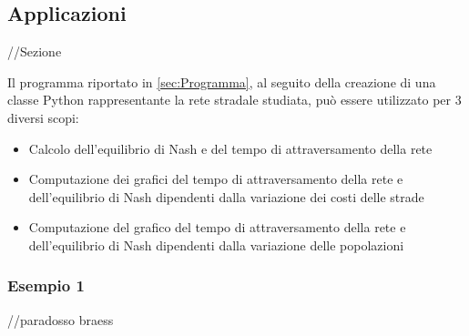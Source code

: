 \subsection{Applicazioni}//Sezione
\label{subsec:Esempi}

Il programma riportato in \autoref{sec:Programma}, al seguito della creazione di una classe Python \cite{python_docs} rappresentante
la rete stradale studiata, può essere utilizzato per 3 diversi scopi:
\begin{itemize}
    \item Calcolo dell'equilibrio di Nash e del tempo di attraversamento della rete
    \item Computazione dei grafici del tempo di attraversamento della rete e dell'equilibrio di Nash dipendenti dalla variazione dei costi delle strade
    \item Computazione del grafico del tempo di attraversamento della rete e dell'equilibrio di Nash dipendenti dalla variazione delle popolazioni
\end{itemize}

\subsubsection{Esempio 1}//paradosso braess
\label{subsubsec:Es1}

